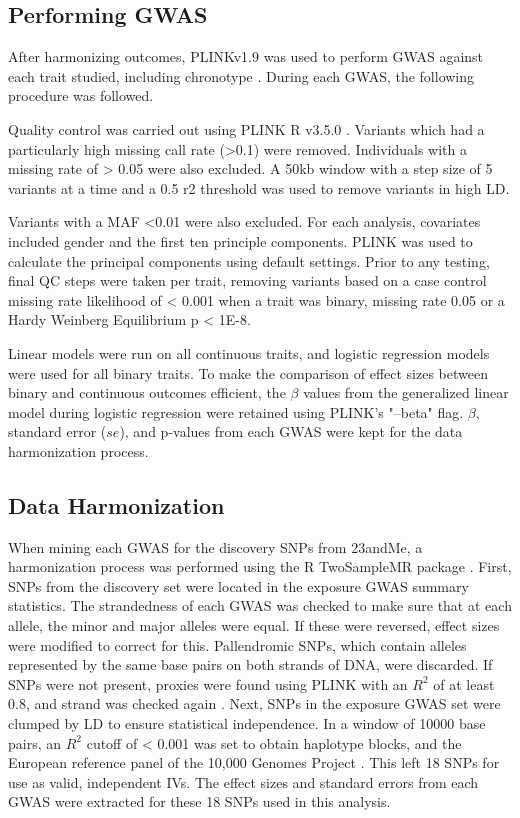\documentclass[journal,article,submit,moreauthors,pdftex]{Definitions/mdpi}
\begin{document}


\subsection{Performing GWAS}
After harmonizing outcomes, PLINKv1.9 was used to perform GWAS against each trait studied, including chronotype \citep{chang_second-generation_2015}. During each GWAS, the following procedure was followed.

Quality control was carried out using PLINK R v3.5.0 \citep{r_core_team_r:_2013}. Variants which had a particularly high missing call rate (>0.1) were removed. Individuals with a missing rate of > 0.05 were also excluded. A 50kb window with a step size of 5 variants at a time and a 0.5 r2 threshold was used to remove variants in high LD. 

Variants with a MAF <0.01 were also excluded. For each analysis, covariates included gender and the first ten principle components. PLINK was used to calculate the principal components using default settings. Prior to any testing, final QC steps were taken per trait, removing variants based on a case control missing rate likelihood of < 0.001 when a trait was binary, missing rate 0.05 or a Hardy Weinberg Equilibrium p < 1E-8. 

Linear models were run on all continuous traits, and logistic regression models were used for all binary traits. To make the comparison of effect sizes between binary and continuous outcomes efficient, the $\beta$ values from the generalized linear model during logistic regression were retained using PLINK's "--beta" flag. $\beta$, standard error ($se$), and p-values from each GWAS were kept for the data harmonization process.

\subsection{Data Harmonization}
When mining each GWAS for the discovery SNPs from 23andMe, a harmonization process was performed using the R TwoSampleMR package \citep{hemani_mr-base_2018}. First, SNPs from the discovery set were located in the exposure GWAS summary statistics. The strandedness of each GWAS was checked to make sure that at each allele, the minor and major alleles were equal. If these were reversed, effect sizes were modified to correct for this. Pallendromic SNPs, which contain alleles represented by the same base pairs on both strands of DNA, were discarded. If SNPs were not present, proxies were found using PLINK with an $R^2$ of at least 0.8, and strand was checked again \citep{plink}. Next, SNPs in the exposure GWAS set were clumped by LD to ensure statistical independence. In a window of 10000 base pairs, an $R^2$ cutoff of < 0.001 was set to obtain haplotype blocks, and the European reference panel of the 10,000 Genomes Project \citep{10kgenomes}. This left 18 SNPs for use as valid, independent IVs. The effect sizes and standard errors from each GWAS were extracted for these 18 SNPs used in this analysis. 
\end{document}
